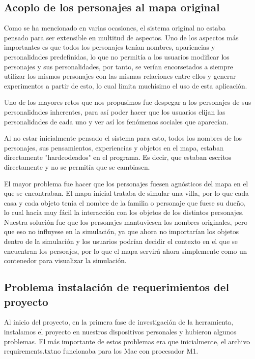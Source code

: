 \subsection{Acoplo de los personajes al mapa original}
\label{problemaPersonajes}
Como se ha mencionado en varias ocasiones, el sistema original no estaba pensado para ser extensible en multitud de aspectos. Uno de los aspectos más importantes es que todos los personajes tenían nombres, apariencias y personalidades predefinidas, lo que no permitía a los usuarios modificar los personajes y sus personalidades, por tanto, se verían encorsetados a siempre utilizar los mismos personajes con las mismas relaciones entre ellos y generar experimentos a partir de esto, lo cual limita muchísimo el uso de esta aplicación.

Uno de los mayores retos que nos propusimos fue despegar a los personajes de sus personalidades inherentes, para así poder hacer que los usuarios elijan las personalidades de cada uno y ver así los fenómenos sociales que aparecían.

Al no estar inicialmente pensado el sistema para esto, todos los nombres de los personajes, sus pensamientos, experiencias y objetos en el mapa, estaban directamente "hardcodeados" en el programa. Es decir, que estaban escritos directamente y no se permitía que se cambiasen.

El mayor problema fue hacer que los personajes fuesen agnósticos del mapa en el que se encontraban. El mapa inicial trataba de simular una villa, por lo que cada casa y cada objeto tenía el nombre de la familia o personaje que fuese su dueño, lo cual hacía muy fácil la interacción con los objetos de los distintos personajes. Nuestra solución fue que los personajes mantuviesen los nombres originales, pero que eso no influyese en la simulación, ya que ahora no importarían los objetos dentro de la simulación y los usuarios podrían decidir el contexto en el que se encuentran los persoajes, por lo que el mapa servirá ahora simplemente como un contenedor para visualizar la simulación.

\subsection{Problema instalación de requerimientos del proyecto}

Al inicio del proyecto, en la primera fase de investigación de la herramienta, instalamos el proyecto en nuestros dispositivos personales y hubieron algunos problemas. El más importante de estos problemas era que inicialmente, el archivo \textquotesingle requirements.txt\textquotesingle no funcionaba para los Mac con procesador M1.

